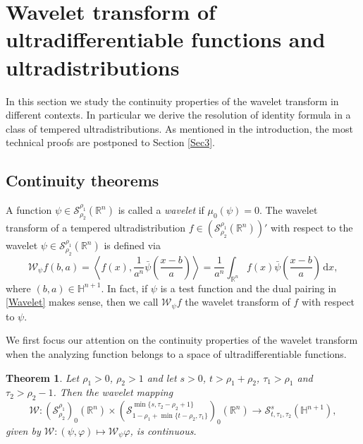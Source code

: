 \documentclass[reqno,12pt]{amsart}
\theoremstyle{plain}
\newtheorem{theorem}{Theorem}
\theoremstyle{definition}
\theoremstyle{remark}
\begin{document}
\par

\section{Wavelet transform of ultradifferentiable functions and ultradistributions} \label{Sec2}

In this section we study the continuity properties of the wavelet
transform in different contexts. In particular we derive the
resolution of identity formula in a class of tempered
ultradistributions. As mentioned in the introduction, the most technical proofs
are postponed to Section \ref{Sec3}.

\subsection{Continuity theorems}
A function $ \psi \in {\mathcal S}^{\rho_1}_{\rho_2} (\mathbb{R}^n)$
is called a {\em wavelet} if  $\mu_{0}(\psi ) = 0$.
The wavelet transform of a tempered ultradistribution $ f \in
({\mathcal S}^{\rho_1}_{\rho_2} (\mathbb{R}^n))' $ with respect to the
wavelet $ \psi \in {\mathcal S}^{\rho_1}_{\rho_2} (\mathbb{R}^n)$ is
defined via
\begin{equation}  \label{Wavelet}
\mathcal{W}_{\psi} f (b, a) = \left\langle f (x), \frac{1}{a^n}
\bar{\psi}\left(\frac{x - b}{a}\right) \right\rangle =
\frac{1}{a^n}\int_{\mathbb{R}^n} f (x)  \bar{\psi}\left(\frac{x -
b}{a}\right) \,\mathrm{d}x,
\end{equation}
where $(b,a)\in \mathbb{H}^{n+1}$. In fact, if $ \psi $ is a test function and
the dual pairing in \eqref{Wavelet} makes sense, then we call $ \mathcal{W}_{\psi} f $
the wavelet transform of $f$ with respect to $ \psi $.

\par

We first focus our attention on the continuity properties of the
wavelet transform when the analyzing function belongs to a space of
ultradifferentiable functions. 

\par

\begin{theorem} \label{th3} Let  $\rho_1 > 0 $, $ \rho_2 > 1 $ and let
$ s >0$, $ t > \rho_1 + \rho_2 $,  $ \tau_1 >\rho_1  $ and $ \tau_2  > \rho_2 - 1$.
Then the wavelet mapping
$$
{\mathcal W} : ({\mathcal S}^{\rho_1} _ {\rho_2})_0
(\mathbb{R}^n) \times ({\mathcal S}^{\min\{s, \tau_2 - \rho_2 +1\}}_{1
- \rho_1+  \min\{t - \rho_2, \tau_1\} })_0 (\mathbb{R}^n) \to
{\mathcal S}^{s}_{t, \tau_1, \tau_2} (\mathbb{H}^{n+1}),
$$
given by $ {\mathcal W} : (\psi, \varphi) \mapsto {\mathcal
W}_{\psi} \varphi $, is continuous.
\end{theorem}
\end{document}
